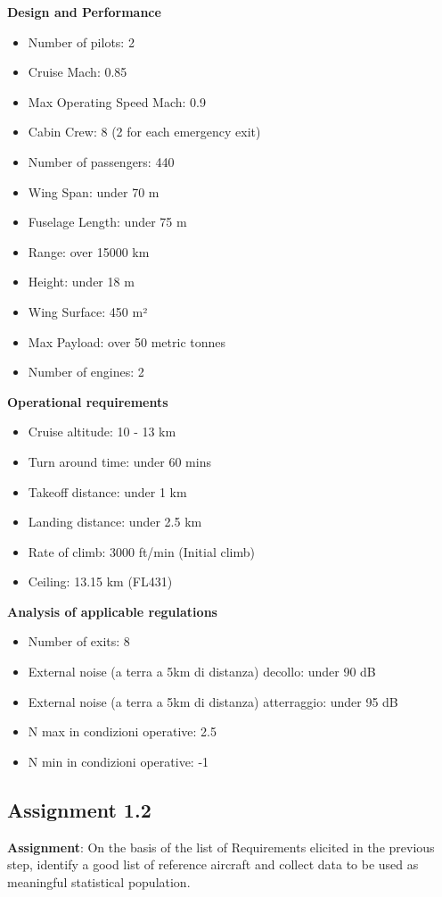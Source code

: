 \documentclass{article}
\begin{document}
\textbf{Design and Performance\label{Design_and_performance}}
\begin{itemize}
    \item Number of pilots: 2
    \item Cruise Mach: 0.85
    \item Max Operating Speed Mach: 0.9
    \item Cabin Crew: 8 (2 for each emergency exit)
    \item Number of passengers: 440
    \item Wing Span: under 70 m
    \item Fuselage Length: under 75 m
    \item Range: over 15000 km
    \item Height: under 18 m
    \item Wing Surface: 450 m²
    \item Max Payload: over 50 metric tonnes
    \item Number of engines: 2
\end{itemize}
\pagebreak
\textbf{Operational requirements\label{Operational_requirements}}
\begin{itemize}
    \item Cruise altitude: 10 - 13 km
    \item Turn around time: under 60 mins
    \item Takeoff distance: under 1 km
    \item Landing distance: under 2.5 km
    \item Rate of climb: 3000 ft/min (Initial climb)
    \item Ceiling: 13.15 km (FL431)
\end{itemize}

\textbf{Analysis of applicable regulations\label{Analysis_applicable_regulations}}
\begin{itemize}
    \item Number of exits: 8
    \item External noise (a terra a 5km di distanza) decollo: under 90 dB
    \item External noise (a terra a 5km di distanza) atterraggio: under 95 dB
    \item N max in condizioni operative: 2.5
    \item N min in condizioni operative: -1
\end{itemize}
\pagebreak
\subsection{Assignment 1.2\label{Assignment_1.2}}
\textbf{Assignment}: On the basis of the list of Requirements elicited
in the previous step, identify a good list of reference aircraft and
collect data to be used as meaningful statistical population.\\ \\ \\ 
\end{document}

